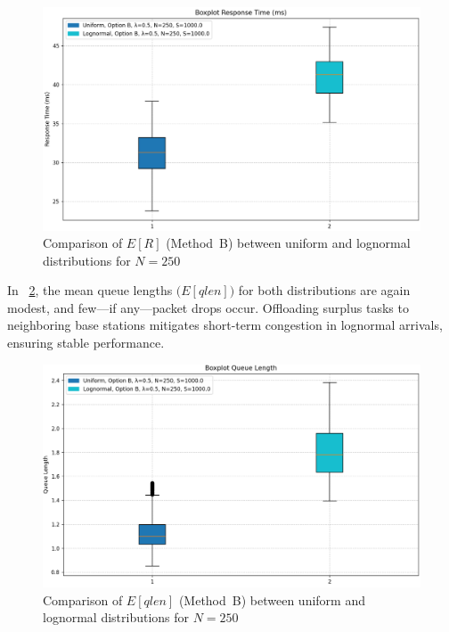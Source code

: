 \documentclass{report}
\begin{document}
\begin{figure}[H]
    \centering
    \includegraphics[width=\textwidth]{img/plots/N-vary/R_B_N250.png}
    \caption{Comparison of \(E[R]\) (Method~B) between uniform and lognormal distributions for \(N = 250\)}
    \label{fig:R_B_N250}
\end{figure}

\begin{flushleft}
In \figurename~\ref{fig:Q_B_N250}, the mean queue lengths \(\bigl(E[qlen]\bigr)\) for both distributions are again modest, and few—if any—packet drops occur. Offloading surplus tasks to neighboring base stations mitigates short-term congestion in lognormal arrivals, ensuring stable performance.
\end{flushleft}

\begin{figure}[H]
    \centering
    \includegraphics[width=\textwidth]{img/plots/N-vary/Q_B_N250.png}
    \caption{Comparison of \(E[qlen]\) (Method~B) between uniform and lognormal distributions for \(N = 250\)}
    \label{fig:Q_B_N250}
\end{figure}
\end{document}
